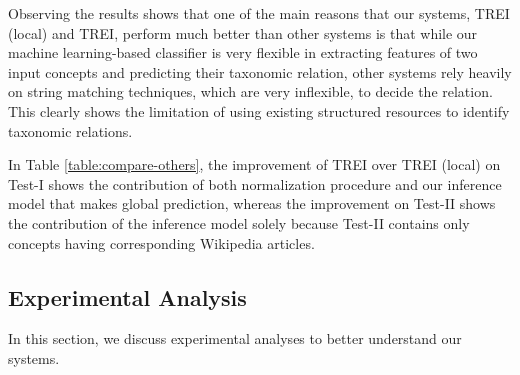 Observing the results shows that one of the main reasons that our
systems, TREI (local) and TREI, perform much better than
other systems is that while our machine learning-based classifier is
very flexible in extracting features of two input concepts and
predicting their taxonomic relation, other systems rely heavily on
string matching techniques, which are very inflexible, to decide the
relation. This clearly shows the limitation of using existing
structured resources to identify taxonomic relations.

In Table \ref{table:compare-others}, the improvement of TREI over TREI
(local) on Test-I shows the contribution of both normalization
procedure and our inference model that makes global prediction,
whereas the improvement on Test-II shows the contribution of the
inference model solely because Test-II contains only concepts having
corresponding Wikipedia articles.


\subsection{Experimental Analysis}

In this section, we discuss experimental analyses to better understand
our systems.  


